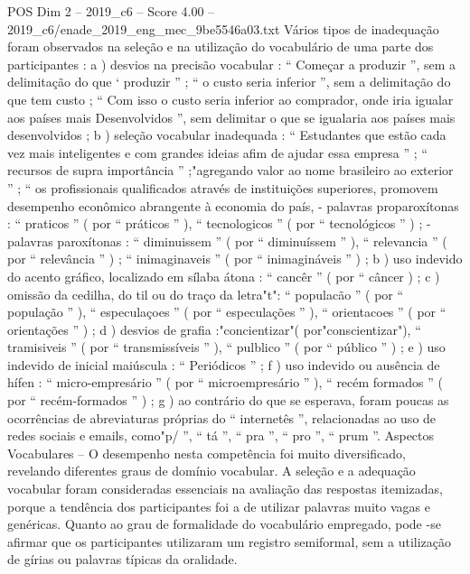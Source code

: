 \begin{textsample}{POS Dim 2 – 2019\_c6 – Score 4.00 – 2019\_c6/enade\_2019\_eng\_mec\_9be5546a03.txt}
Vários tipos de inadequação foram observados na seleção e na utilização do vocabulário de uma parte dos participantes : a ) desvios na precisão vocabular : “ Começar a produzir ”, sem a delimitação do que ‘ produzir ” ; “ o custo seria inferior ”, sem a delimitação do que tem custo ; “ Com isso o custo seria inferior ao comprador, onde iria igualar aos países mais Desenvolvidos ”, sem delimitar o que se igualaria aos países mais desenvolvidos ; b ) seleção vocabular inadequada : “ Estudantes que estão cada vez mais inteligentes e com grandes ideias afim de ajudar essa empresa ” ; “ recursos de supra importância ” ;"agregando valor ao nome brasileiro ao exterior ” ; “ os profissionais qualificados através de instituições superiores, promovem desempenho econômico abrangente à economia do país, - palavras proparoxítonas : “ praticos ” ( por “ práticos ” ), “ tecnologicos ” ( por “ tecnológicos ” ) ; - palavras paroxítonas : “ diminuissem ” ( por “ diminuíssem ” ), “ relevancia ” ( por “ relevância ” ) ; “ inimaginaveis ” ( por “ inimagináveis ” ) ; b ) uso indevido do acento gráfico, localizado em sílaba átona : “ cancêr ” ( por “ câncer ) ; c ) omissão da cedilha, do til ou do traço da letra"t": “ populacão ” ( por “ população ” ), “ especulaçoes ” ( por “ especulações ” ), “ orientacoes ” ( por “ orientações ” ) ; d ) desvios de grafia :"concientizar"( por"conscientizar"), “ tramisiveis ” ( por “ transmissíveis ” ), “ pulblico ” ( por “ público ” ) ; e ) uso indevido de inicial maiúscula : “ Periódicos ” ; f ) uso indevido ou ausência de hífen : “ micro-empresário ” ( por “ microempresário ” ), “ recém formados ” ( por “ recém-formados ” ) ; g ) ao contrário do que se esperava, foram poucas as ocorrências de abreviaturas próprias do “ internetês ”, relacionadas ao uso de redes sociais e emails, como"p/ ”, “ tá ”, “ pra ”, “ pro ”, “ prum ”.
Aspectos Vocabulares – O desempenho nesta competência foi muito diversificado, revelando diferentes graus de domínio vocabular.
A seleção e a adequação vocabular foram consideradas essenciais na avaliação das respostas itemizadas, porque a tendência dos participantes foi a de utilizar palavras muito vagas e genéricas.
Quanto ao grau de formalidade do vocabulário empregado, pode -se afirmar que os participantes utilizaram um registro semiformal, sem a utilização de gírias ou palavras típicas da oralidade.

\end{textsample}
